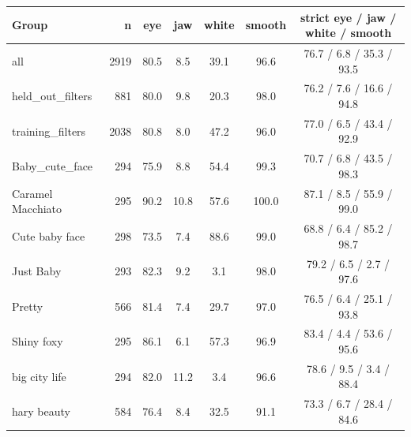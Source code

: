 \begin{tabular}{@{}l r cccc c@{}}
\toprule
Group & n & eye & jaw & white & smooth & strict eye / jaw / white / smooth \\
\midrule
all & 2919 & 80.5 & 8.5 & 39.1 & 96.6 & 76.7 / 6.8 / 35.3 / 93.5 \\
held\_out\_filters & 881 & 80.0 & 9.8 & 20.3 & 98.0 & 76.2 / 7.6 / 16.6 / 94.8 \\
training\_filters & 2038 & 80.8 & 8.0 & 47.2 & 96.0 & 77.0 / 6.5 / 43.4 / 92.9 \\
Baby\_cute\_face & 294 & 75.9 & 8.8 & 54.4 & 99.3 & 70.7 / 6.8 / 43.5 / 98.3 \\
Caramel Macchiato & 295 & 90.2 & 10.8 & 57.6 & 100.0 & 87.1 / 8.5 / 55.9 / 99.0 \\
Cute baby face & 298 & 73.5 & 7.4 & 88.6 & 99.0 & 68.8 / 6.4 / 85.2 / 98.7 \\
Just Baby & 293 & 82.3 & 9.2 & 3.1 & 98.0 & 79.2 / 6.5 / 2.7 / 97.6 \\
Pretty & 566 & 81.4 & 7.4 & 29.7 & 97.0 & 76.5 / 6.4 / 25.1 / 93.8 \\
Shiny foxy & 295 & 86.1 & 6.1 & 57.3 & 96.9 & 83.4 / 4.4 / 53.6 / 95.6 \\
big city life & 294 & 82.0 & 11.2 & 3.4 & 96.6 & 78.6 / 9.5 / 3.4 / 88.4 \\
hary beauty & 584 & 76.4 & 8.4 & 32.5 & 91.1 & 73.3 / 6.7 / 28.4 / 84.6 \\
\bottomrule
\end{tabular}
